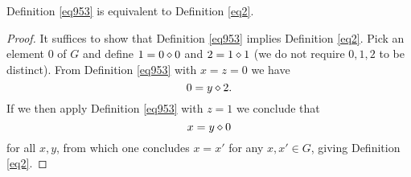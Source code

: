 \begin{theorem}[953 is equivalent to 2]\label{953_equiv_2}  Definition \ref{eq953} is equivalent to Definition \ref{eq2}.
\end{theorem}

\begin{proof}  It suffices to show that Definition \ref{eq953} implies Definition \ref{eq2}.  Pick an element $0$ of $G$ and define $1 = 0 \diamond 0$ and $2 = 1 \diamond 1$ (we do not require $0,1,2$ to be distinct).
From Definition \ref{eq953} with $x=z=0$ we have
$$ 0 = y \diamond 2.$$
If we then apply Definition \ref{eq953} with $z=1$ we conclude that
$$ x = y \diamond 0$$
for all $x,y$, from which one concludes $x=x'$ for any $x,x' \in G$, giving Definition \ref{eq2}.
\end{proof}
